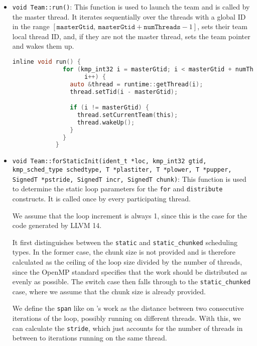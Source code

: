 \begin{itemize}
	\item \texttt{void Team::run()}: This function is used to launch the team and is called by the
	      master thread. It iterates sequentially over the threads with a global ID in the range
	      $[\texttt{masterGtid},\: \texttt{masterGtid} + \texttt{numThreads} - 1]$, sets their team
	      local thread ID, and, if they are not the master thread, sets the team pointer and wakes them
	      up.

	      \begin{lstlisting}[language=C, caption={void Team::run},
          label={lst:team-run}, escapechar=@]
            inline void run() {
              for (kmp_int32 i = masterGtid; i < masterGtid + numThreads;
                    i++) {
                auto &thread = runtime::getThread(i);
                thread.setTid(i - masterGtid);

                if (i != masterGtid) {
                  thread.setCurrentTeam(this);
                  thread.wakeUp();
                }
              }
            }
          \end{lstlisting}

	\item \texttt{void Team::forStaticInit(ident_t *loc, kmp_int32 gtid,\\kmp_sched_type schedtype,
		      T *plastiter, T *plower, T *pupper,\\SignedT *pstride, SignedT incr, SignedT chunk)}:
	      \label{subsubsec:team-forstaticinit}
	      This function is used to determine the static loop parameters for the \texttt{for} and
	      \texttt{distribute} constructs. It is called once by every participating thread.

	      We assume that the loop increment is always 1, since this is the case for the code
	      generated by LLVM 14.

	      It first distinguishes between the \texttt{static} and \texttt{static_chunked} scheduling
	      types. In the former case, the chunk size is not provided and is therefore calculated as
	      the ceiling of the loop size divided by the number of threads, since the OpenMP standard
	      specifies that the work should be distributed as evenly as possible. The switch case then
	      falls through to the \texttt{static_chunked} case, where we assume that the chunk size is
	      already provided.

	      We define the \texttt{span} like on \citeauthor{herokmp}'s work as the distance between two
	      consecutive iterations of the loop, possibly running on different threads. With this, we
	      can calculate the \texttt{stride}, which just accounts for the number of threads in
	      between to iterations running on the same thread.


\end{itemize}
